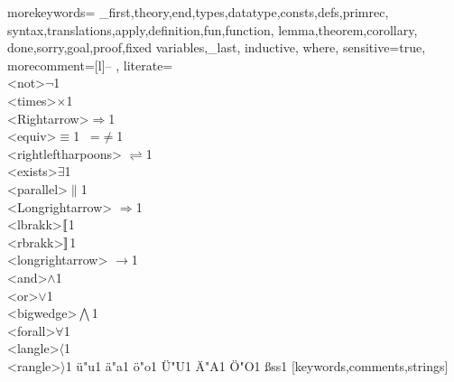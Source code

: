 
\usepackage{amsmath}
\usepackage{amsfonts}
\usepackage{amssymb}
\usepackage{mathtools}
\usepackage{caption}

\usepackage{verbatim}
\usepackage{pstricks,pst-node}
\usepackage{fancyvrb}
\usepackage[fancyvrb]{listings}

\newcommand{\nsubset}{\not\subset}
\newcommand{\setB}{{\mathord{\mathbb B}}}
\newcommand{\setC}{{\mathord{\mathbb C}}}
\newcommand{\setN}{{\mathord{\mathbb N}}}
\newcommand{\setQ}{{\mathord{\mathbb Q}}}
\newcommand{\setR}{{\mathord{\mathbb R}}}
\newcommand{\setZ}{{\mathord{\mathbb Z}}}
\newcommand{\coloncolon}{\mathrel{::}}
\newcommand{\lsemantics}{\mathopen{\lbrack\mkern-3mu\lbrack}}
\newcommand{\rsemantics}{\mathclose{\rbrack\mkern-3mu\rbrack}}
\newcommand{\lcata}{\mathopen{(\mkern-3mu\mid}}
\newcommand{\rcata}{\mathclose{\mid\mkern-3mu)}}

%
  {morekeywords={
        _first,theory,end,types,datatype,consts,defs,primrec,
        syntax,translations,apply,definition,fun,function, lemma,theorem,corollary,
        done,sorry,goal,proof,fixed variables,_last, inductive, where},
        sensitive=true,
        morecomment=[l]{-- },
        literate=
                {\\<not>}{{$¬$}}1 {\\<times>}{{$×$}}1                 
                {\\<Rightarrow>}{{$\Rightarrow$}}1%
                {\\<equiv>}{{$\equiv$}}1 {~=}{{$\not=$}}1                         
                {\\<rightleftharpoons>}
                        {{$\rightleftharpoons$}}1
                {\\<exists>}{{$\exists$}}1
                {\\<parallel>}{{$\parallel$}}1
                {\\<Longrightarrow>}
                        {{$\Longrightarrow$}}1
                 {\\<lbrakk>}{{$\lsemantics$}}1
                {\\<rbrakk>}{{$\rsemantics$}}1
                {\\<longrightarrow>}
                        {{$\longrightarrow$}}1
                {\\<and>}{{$\land$}}1
                {\\<or>}{{$\lor$}}1
                {\\<bigwedge>}{{$\bigwedge$}}1
                {\\<forall>}{{$\forall$}}1
                {\\<langle>}{{$\langle$}}1
                {\\<rangle>}{{$\rangle$}}1
                {ü}{"u}1 {ä}{"a}1 {ö}{"o}1
                {Ü}{"U}1 {Ä}{"A}1 {Ö}{"O}1 {ß}{{ss}}1
  }[keywords,comments,strings]%

